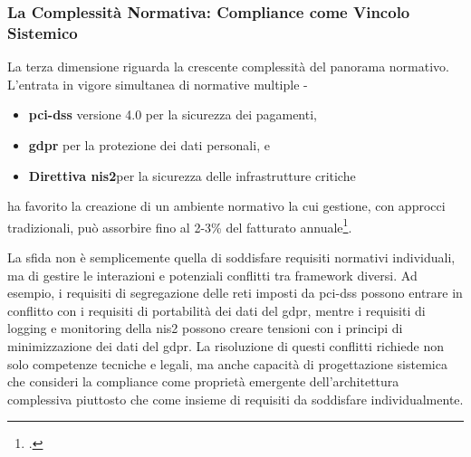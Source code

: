 
\subsubsection{\texorpdfstring{\textbf{La Complessità Normativa: Compliance come Vincolo Sistemico}}{1.1.2.3 - La Complessità Normativa: Compliance come Vincolo Sistemico}}

La terza dimensione riguarda la crescente complessità del panorama normativo. L'entrata in vigore simultanea di normative multiple - 
\begin{itemize}
    \item \textbf{\gls{pci-dss} } versione 4.0 per la sicurezza dei pagamenti,
    \item \textbf{\gls{gdpr} } per la protezione dei dati personali, e
    \item \textbf{Direttiva \gls{nis2}}per la sicurezza delle infrastrutture critiche 
\end{itemize}
ha favorito la creazione di  un ambiente normativo la cui gestione, con approcci tradizionali, può assorbire fino al 2-3\% del fatturato annuale\footcite{ponemon2024compliance}.

La sfida non è semplicemente quella di soddisfare requisiti normativi individuali, ma di gestire le interazioni e potenziali conflitti tra framework diversi. 
Ad esempio, i requisiti di segregazione delle reti imposti da \gls{pci-dss} possono entrare in conflitto con i requisiti di portabilità dei dati del \gls{gdpr}, mentre i requisiti di logging e monitoring della \gls{nis2} possono creare tensioni con i principi di minimizzazione dei dati del \gls{gdpr}. 
La risoluzione di questi conflitti richiede non solo competenze tecniche e legali, ma anche capacità di progettazione sistemica che consideri la compliance come proprietà emergente dell'architettura complessiva piuttosto che come insieme di requisiti da soddisfare individualmente.

